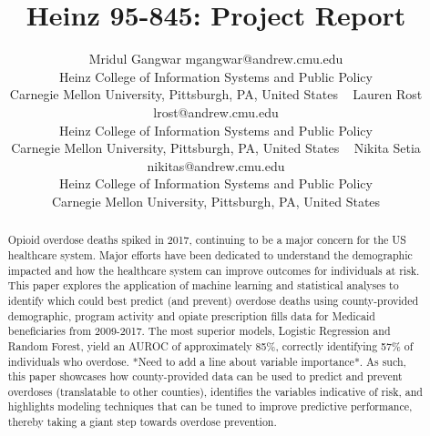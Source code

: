 \documentclass[twoside,10.5pt]{article}
\begin{document}
\title{Heinz 95-845: Project Report}

\author{\name Mridul Gangwar \email mgangwar@andrew.cmu.edu \\
       \addr Heinz College of Information Systems and Public Policy\\
       Carnegie Mellon University, Pittsburgh, PA, United States \
       \AND
       \name Lauren Rost \email lrost@andrew.cmu.edu \\
       \addr Heinz College of Information Systems and Public Policy\\
       Carnegie Mellon University, Pittsburgh, PA, United States \
       \AND
       \name Nikita Setia \email nikitas@andrew.cmu.edu \\
       \addr Heinz College of Information Systems and Public Policy\\
       Carnegie Mellon University, Pittsburgh, PA, United States}
       
\maketitle
\vspace*{5px}
\begin{abstract}
Opioid overdose deaths spiked in 2017, continuing to be a major concern for the US healthcare system. Major efforts have been dedicated to understand the demographic impacted and how the healthcare system can improve outcomes for individuals at risk. This paper explores the application of machine learning and statistical analyses to identify which could best predict (and prevent) overdose deaths using county-provided demographic, program activity and opiate prescription fills data for Medicaid beneficiaries from 2009-2017. The most superior models, Logistic Regression and Random Forest, yield an AUROC of approximately 85\%, correctly identifying 57\% of individuals who overdose. *Need to add a line about variable importance*. As such, this paper showcases how county-provided data can be used to predict and prevent overdoses (translatable to other counties), identifies the variables indicative of risk, and highlights modeling techniques that can be tuned to improve predictive performance, thereby taking a giant step towards overdose prevention.  
\end{abstract}
\end{document}
